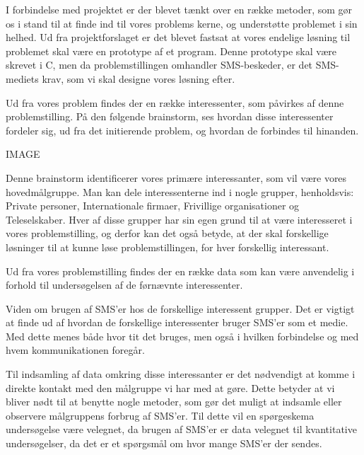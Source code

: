 I forbindelse med projektet er der blevet tænkt over en række metoder, som gør os i stand til at finde ind til vores problems kerne, og understøtte problemet i sin helhed.
Ud fra projektforslaget er det blevet fastsat at vores endelige løsning til problemet skal være en prototype af et program. Denne prototype skal være skrevet i C, men da problemstillingen omhandler SMS-beskeder, er det  SMS-mediets krav, som vi skal designe vores løsning efter.


Ud fra vores problem findes der en række interessenter, som påvirkes af denne problemstilling.
På den følgende brainstorm, ses hvordan disse interessenter fordeler sig, ud fra det initierende problem, og hvordan de forbindes til hinanden.

IMAGE

Denne brainstorm identificerer vores primære interessanter, som vil være vores hovedmålgruppe.
Man kan dele interessenterne ind i nogle grupper, henholdsvis: Private personer, Internationale firmaer, Frivillige organisationer og Teleselskaber.
Hver af disse grupper har sin egen grund til at være interesseret i vores problemstilling, og derfor kan det også betyde, at der skal forskellige løsninger til at kunne løse problemstillingen, for hver forskellig interessant.


Ud fra vores problemstilling findes der en række data som kan være anvendelig i forhold til undersøgelsen af de førnævnte interessenter.


Viden om brugen af SMS’er hos de forskellige interessent grupper.
Det er vigtigt at finde ud af hvordan de forskellige interessenter bruger SMS’er som et medie. Med dette menes både hvor tit det bruges, men også i hvilken forbindelse og med hvem kommunikationen foregår.


Til indsamling af data omkring disse interessanter er det nødvendigt at komme i direkte kontakt med den målgruppe vi har med at gøre. Dette betyder at vi bliver nødt til at benytte nogle metoder, som gør det muligt at indsamle eller observere målgruppens forbrug af SMS’er.
Til dette vil en spørgeskema undersøgelse være velegnet, da brugen af SMS’er er data velegnet til kvantitative undersøgelser, da det er et spørgsmål om hvor mange SMS’er der sendes.
